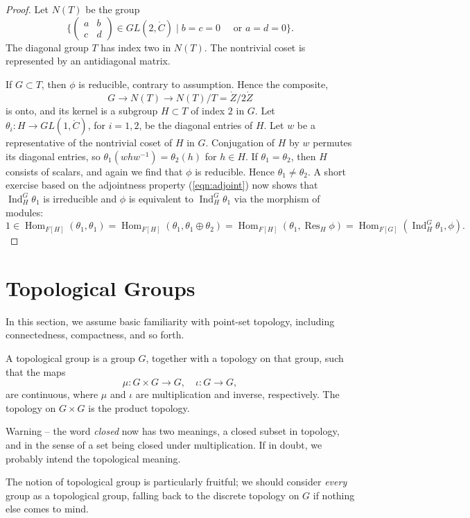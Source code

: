 \documentclass{amsart}
\def\op#1{{\operatorname{#1}}}
\def\CC{\ring{C}}
\begin{document}
\begin{proof}
Let $N(T)$ be the group 
\[
\{\begin{pmatrix} a & b \\ c & d\end{pmatrix} \in GL(2,\CC) \mid
b = c =0 \quad \text{ or } a = d = 0\}.
\]
The diagonal group $T$ has index two in $N(T)$.
The nontrivial coset is represented by an  antidiagonal matrix.

If $G\subset T$, then $\phi$ is reducible,
contrary to assumption.  Hence the composite,
\[
G\to N(T)\to N(T)/T = \ring{Z}/2\ring{Z}
\]
is onto, and its kernel is a subgroup $H\subset T$ of index $2$ in $G$.
Let
$\theta_i:H\to GL(1,\CC)$, for $i=1,2$, be the diagonal entries
of $H$.  Let $w$ be a representative of the nontrivial coset of $H$ in
$G$.  Conjugation of $H$ by $w$ permutes its diagonal entries, so
$\theta_1(w h w^{-1}) = \theta_2(h)$ for $h\in H$.  If
$\theta_1=\theta_2$, then $H$ consists of scalars, and again we find
that $\phi$ is reducible.  Hence $\theta_1\ne\theta_2$.  A short
exercise based on the adjointness property (\ref{eqn:adjoint}) now
shows that $\op{Ind}_H^G\theta_1$ is irreducible and $\phi$ is
equivalent to $\op{Ind}_H^G\theta_1$ via the morphism of modules:
\[
1\in\op{Hom}_{F[H]}(\theta_1,\theta_1)=\op{Hom}_{F[H]}(\theta_1,\theta_1\oplus\theta_2)=
\op{Hom}_{F[H]}(\theta_1,\op{Res}_H\phi) = \op{Hom}_{F[G]}(\op{Ind}_H^G\theta_1,\phi).
\]
\end{proof}

\newpage
\section{Topological Groups}

In this section, we assume basic familiarity with point-set topology,
including connectedness, compactness, and so forth. 

A topological group is a group $G$, together with a topology on that
group, such that the maps
\[
\mu:G\times G\to G,\quad \iota:G\to G,
\]
are continuous, where $\mu$ and $\iota$ are multiplication and
inverse, respectively.  The topology on $G\times G$ is the product
topology.

Warning -- the word {\it closed} now has two meanings, a closed subset
in topology, and in the sense of a set being closed under
multiplication.  If in doubt, we probably intend the topological
meaning.

The notion of topological group is particularly fruitful; we should
consider {\it every} group as a topological group, falling back to the
discrete topology on $G$ if nothing else comes to mind.
\end{document}
